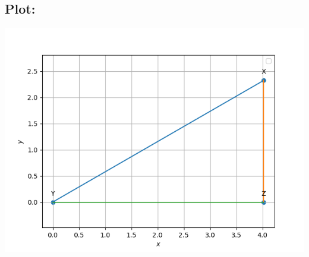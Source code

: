 \documentclass[10pt,a4paper]{report}
\begin{document}
\begin{multicols}{2}
 \section{Plot:}
 	\begin{center}
  \includegraphics[scale=0.55]{line.png}
  	\end{center}
  


  



\vspace{3cm}

\end{multicols}
\end{document}
